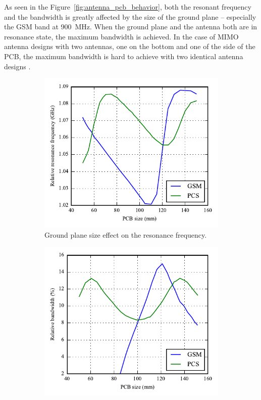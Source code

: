 As seen in the Figure~\ref{fig:antenna_pcb_behavior}, both the resonant frequency and the bandwidth is greatly affected by the size of the ground plane -- especially the GSM band at \SI{900}{MHz}. When the ground plane and the antenna both are in resonance state, the maximum bandwidth is achieved. In the case of MIMO antenna designs with two antennas, one on the bottom and one of the side of the PCB, the maximum bandwidth is hard to achieve with two identical antenna designs \cite{sanchez2008multiband}. 

\begin{figure}[htbp]
   \begin{subfigure}[b]{0.49\linewidth}
        \centering
        \includegraphics{img/analysis/pcbsize_freq.pdf}
        \caption{Ground plane size effect on the resonance frequency.}
    \end{subfigure}
    \hfill
    \begin{subfigure}[b]{0.49\linewidth}
        \centering
        \includegraphics{img/analysis/pcbsize_bandwidth.pdf}

\end{subfigure}
\end{figure}
